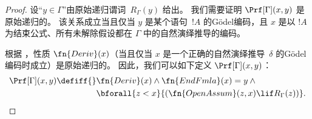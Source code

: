 \documentclass[../../../include/open-logic-section]{subfiles}
\begin{document}
\begin{proof}
  设“$y \in \Gamma$”由原始递归谓词~$R_\Gamma(y)$ 给出。
  我们需要证明 $\Prf[\Gamma](x, y)$ 是原始递归的。
  该关系成立当且仅当 $y$ 是某个语句~$!A$ 的Gödel编码，且 $x$ 是以 $!A$ 为结束公式、所有未解除假设都在 $\Gamma$ 中的自然演绎推导的编码。

  根据 ，性质 $\fn{Deriv}(x)$（当且仅当 $x$ 是一个正确的自然演绎推导~$\delta$ 的Gödel编码时成立）是原始递归的。
  因此，我们可以如下定义 $\Prf[\Gamma](x, y)$：
  \begin{align*}
    \Prf[\Gamma](x, y) \defiff {}
    & \fn{Deriv}(x) \land \fn{EndFmla}(x) = y \land {} \\
    & \bforall{z < x}{(\fn{OpenAssum}(z, x) \lif R_\Gamma(z))}.
  \end{align*}
\end{proof}
\end{document}
